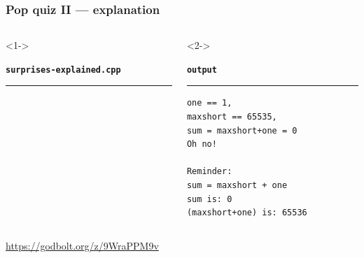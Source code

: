 \documentclass[aspectratio=169]{beamer}
\begin{document}
\begin{frame}[fragile]
\frametitle{Pop quiz II --- explanation}
\begin{columns}[T]
  \begin{column}{0.7\textwidth}<1->
    {\color[HTML]{cb4b16}
    \texttt{\textbf{surprises-explained.cpp}}\vspace{-9pt}
    \rule{\linewidth}{2pt}}%
    {\fontsize{8}{6} }%
    \vspace{-12pt}{\color[HTML]{cb4b16}\rule{\linewidth}{2pt}}%
  \end{column}
  \begin{column}{0.25\textwidth}<2->
    {\color[HTML]{002b36}
    \texttt{\textbf{output}}\vspace{-9pt}
    \rule{\linewidth}{2pt}}%
    {\fontsize{8}{6} \begin{lstlisting}[showstringspaces=false]
one == 1,
maxshort == 65535,
sum = maxshort+one = 0
Oh no!

Reminder:
sum = maxshort + one
sum is: 0
(maxshort+one) is: 65536
    \end{lstlisting}
    }
    \vspace{-12pt}{\color[HTML]{002b36}\rule{\linewidth}{2pt}}%
  \end{column}
\end{columns}
\pause{}
\begin{center}\url{https://godbolt.org/z/9WraPPM9v}\end{center}
\end{frame}
\end{document}
